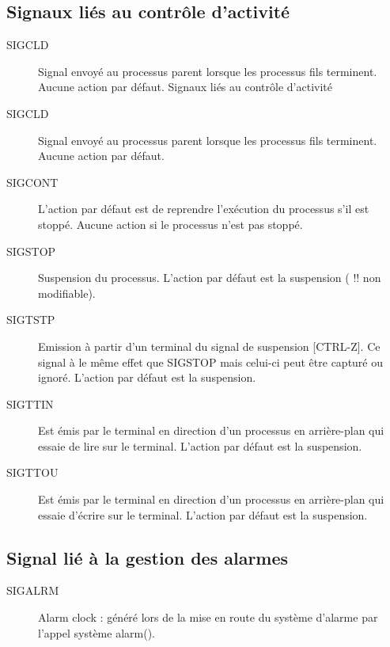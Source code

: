 \documentclass[10pt,french,A4]{article}
\theoremstyle{plain}
\begin{document}
\subsection{Signaux liés au contrôle d'activité}
\begin{description}
   \item[SIGCLD] Signal envoyé au processus parent lorsque les processus fils terminent.
Aucune action par défaut.
Signaux liés au contrôle d'activité
   \item[SIGCLD] Signal envoyé au processus parent lorsque les processus fils terminent.
Aucune action par défaut.
   \item[SIGCONT] L'action par défaut est de reprendre l'exécution du processus s'il est stoppé.
Aucune action si le processus n'est pas stoppé.
   \item[SIGSTOP] Suspension du processus.
L'action par défaut est la suspension ( !! non modifiable).
   \item[SIGTSTP] Emission à partir d'un terminal du signal de suspension [CTRL-Z]. Ce signal à
le même effet que SIGSTOP mais celui-ci peut être capturé ou ignoré.
L'action par défaut est la suspension.
   \item[SIGTTIN] Est émis par le terminal en direction d'un processus en arrière-plan qui essaie
de lire sur le terminal. L'action par défaut est la suspension.
   \item[SIGTTOU] Est émis par le terminal en direction d'un processus en arrière-plan qui essaie
d'écrire sur le terminal. L'action par défaut est la suspension.
\end{description}

\subsection{Signal lié à la gestion des alarmes}
\begin{description}
       \item[SIGALRM]
    Alarm clock : généré lors de la mise en route du système d'alarme par l'appel
    système alarm().
\end{description}

\newpage
\end{document}
